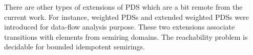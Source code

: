

There are other types of extensions of PDS which are a bit remote from the current work. For instance, weighted PDSs and extended weighted PDSs were introduced  \cite{RepsSJM05, LalRB05} for data-flow analysis purpose. These two extensions associate transitions with elements from semiring domains. The reachability problem is decidable for bounded idempotent semirings. 





 



 




